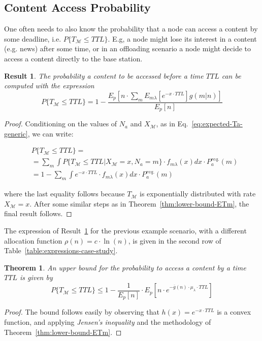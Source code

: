 \documentclass[journal]{IEEEtran}
\newtheorem{theorem}{Theorem}\newtheorem{definition}{Definition}
\newtheorem{result}{Result}
\newcommand{\eq}[1]{Eq.~\eqref{#1}}
\newcommand{\XM}{{X}_{\mathcal{M}}}
\begin{document}
\subsection*{\textbf{Content Access Probability}}

One often needs to also know the probability that a node can access a content by some deadline, i.e. $P\{T_{\mathcal{M}}\leq TTL\}$. E.g, a node might lose its interest in a content (e.g. news) after some time, or in an offloading scenario a node might decide to access a content directly to the base station. 
\begin{result}\label{result:P-Tm-TTL}
The probability a content to be accessed before a time $TTL$ can be computed with the expression
\begin{equation}
P\{T_{\mathcal{M}}\leq TTL\}= 1-\frac{E_{p}\left[n\cdot\sum_{m} E_{m\lambda}\left[e^{-x\cdot TTL}\right] g(m|n)\right]}{E_{p}[n]}\nonumber
\end{equation}
\end{result}
\begin{proof}
Conditioning on the values of $N_{a}$ and $\XM$, as in \eq{eq:expected-Ta-generic}, we can write:
\begin{small}
\begin{align}\label{eq:probability-Ta-generic}
&P\{T_{\mathcal{M}}\leq TTL\} 	=\nonumber\\
&= \sum_{m} \int P\{T_{\mathcal{M}}\leq TTL\vert \XM=x, N_{a}=m\}\cdot f_{m\lambda}(x)dx \cdot P_{a}^{req.}(m)\nonumber\\ 
					&= 1-\sum_{m} \int e^{-x\cdot TTL}\cdot f_{m\lambda}(x)dx \cdot P_{a}^{req.}(m)
\end{align}
\end{small}
where the last equality follows because $T_{\mathcal{M}}$ is exponentially distributed with rate $\XM=x$. After some similar steps as in Theorem~\ref{thm:lower-bound-ETm}, the final result follows.
\end{proof}
The expression of Result~\ref{result:P-Tm-TTL} for the previous example scenario, with a different allocation function $\rho(n) = c\cdot \ln(n)$, is given in the second row of Table~\ref{table:expressions-case-study}.

\begin{theorem}\label{thm:upper-bound-P-Tm-TTL}
An upper bound for the probability to access a content by a time $TTL$ is given by
\begin{equation}
P\{T_{\mathcal{M}}\leq TTL\}\leq 1-\frac{1}{E_{p}[n]}\cdot E_{p}\left[n\cdot e^{-\overline{g}(n)\cdot\mu_{\lambda}\cdot TTL}\right]\nonumber
\end{equation}
\end{theorem}
\begin{proof}
The bound follows easily by observing that $h(x)=e^{-x\cdot TTL}$ is a convex function, and applying \emph{Jensen's inequality} and the methodology of Theorem~\ref{thm:lower-bound-ETm}.
\end{proof}
\end{document}
